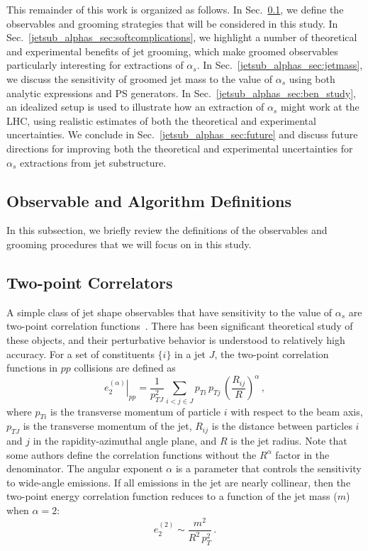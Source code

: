 \documentclass[11pt]{cernrep}
\begin{document}
This remainder of this work is organized as follows.
%
In Sec.~\ref{jetsub_alphas_sec:definitions}, we define the observables and grooming strategies that will be considered in this study.
%
In Sec.~\ref{jetsub_alphas_sec:softcomplications}, we highlight a number of theoretical and experimental benefits of jet grooming, which make groomed observables particularly interesting for extractions of $\alpha_s$.
%
In Sec.~\ref{jetsub_alphas_sec:jetmass}, we discuss the sensitivity of groomed jet mass to the value of $\alpha_s$ using both analytic expressions and PS generators.
%
In Sec.~\ref{jetsub_alphas_sec:ben_study}, an idealized setup is used to illustrate how an extraction of $\alpha_s$ might work at the LHC, using realistic estimates of both the theoretical and experimental uncertainties.
%
We conclude in Sec.~\ref{jetsub_alphas_sec:future} and discuss future directions for improving both the theoretical and experimental uncertainties for $\alpha_s$ extractions from jet substructure.

\subsection{Observable and Algorithm Definitions}
\label{jetsub_alphas_sec:definitions}

In this subsection, we briefly review the definitions of the observables and grooming procedures that we will focus on in this study.

\subsection{Two-point Correlators}\label{jetsub_alphas_sec:shape_def}

A simple class of jet shape observables that have sensitivity to the value of $\alpha_s$ are two-point correlation functions~\cite{Banfi:2004yd,Larkoski:2013eya}.
%
There has been significant theoretical study of these objects, and their perturbative behavior is understood to relatively high accuracy.
%
For a set of constituents $\{i\}$ in a jet $J$, the two-point correlation functions in $pp$ collisions are defined as
%
\begin{equation}
\label{jetsub_alphas_eq:ppe2}
\left.e_2^{(\alpha)}\right|_{pp}=\frac{1}{p_{TJ}^2}\sum_{i<j\in J} p_{Ti} \, p_{Tj} \, \left(\frac{R_{ij}}{R}\right)^\alpha\,, 
\end{equation}
where $p_{Ti}$ is the transverse momentum of particle $i$ with respect to the beam axis, $p_{TJ}$ is the transverse momentum of the jet, $R_{ij}$ is the distance between particles $i$ and $j$ in the rapidity-azimuthal angle plane, and $R$ is the jet radius.
%
Note that some authors define the correlation functions without the $R^\alpha$ factor in the denominator.
%
The angular exponent $\alpha$ is a parameter that controls the sensitivity to wide-angle emissions.
%
If all emissions in the jet are nearly collinear, then the two-point energy correlation function reduces to a function of the jet mass ($m$) when $\alpha=2$:
\begin{equation}
e_2^{(2)}\sim \frac{m^2}{R^2\, p_{T}^2}\,.
\end{equation} 
\end{document}
